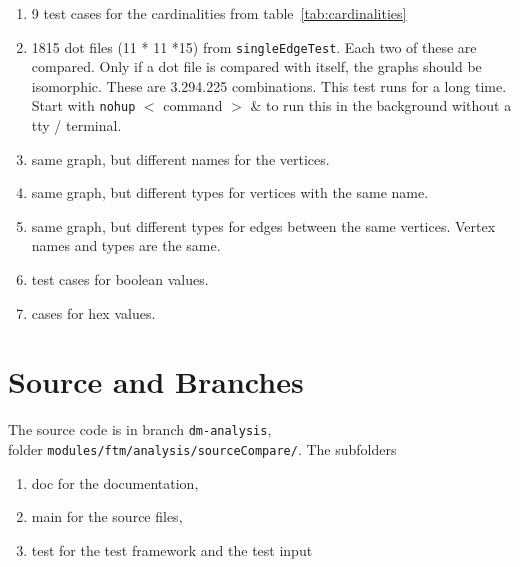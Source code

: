 \documentclass[12pt,a4paper]{report}
\begin{document}
\begin{enumerate}
  \item 9 test cases for the cardinalities from table~\ref{tab:cardinalities}
  \item 1815 dot files (11 * 11 *15) from \texttt{singleEdgeTest}. Each two of these are compared. Only if a dot file is compared with itself, the graphs should be isomorphic. These are 3.294.225 combinations.
This test runs for a long time. Start with \texttt{nohup} $<$ command $>$ \& to run this in the background without a tty / terminal.
  \item same graph, but different names for the vertices.
  \item same graph, but different types for vertices with the same name.
  \item same graph, but different types for edges between the same vertices. Vertex names and types are the same.
  \item test cases for boolean values.
  \item cases for hex values.
\end{enumerate}

\chapter{Source and Branches}
The source code is in branch \texttt{dm-analysis}, \\ 
folder \texttt{modules/ftm/analysis/sourceCompare/}. The subfolders
\begin{enumerate}
  \item doc for the documentation,
  \item main for the source files,
  \item test for the test framework and the test input
\end{enumerate}
\end{document}
